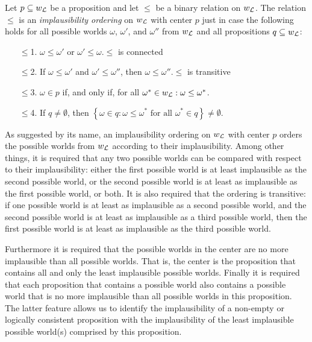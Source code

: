 Let $p\subseteq w_{\cal L}$ be a proposition and let $\leq$ be a binary relation on $w_{\cal L}$. The relation $\leq$ is an \emph{implausibility ordering} on $w_{\cal L}$ with center $p$ just in case the following holds for all possible worlds $\omega$, $\omega'$, and $\omega''$ from $w_{\cal L}$ and all propositions $q\subseteq w_{\cal L}$:
\begin{enumerate}
\item[$\leq$1.] $\omega\leq\omega'$ or $\omega'\leq\omega$.\hfill $\leq$ is connected
\item[$\leq$2.] If $\omega\leq\omega'$ and $\omega'\leq\omega''$, then $\omega\leq\omega''$.\hfill $\leq$ is transitive
\item[$\leq$3.] $\omega\in p$ if, and only if, for all $\omega^*\in w_{\cal L}:\omega\leq\omega^*$.
\item[$\leq$4.] If $q\neq\emptyset$, then $\left\{\omega\in q:\omega\leq\omega^*\mbox{ for all }\omega^*\in q\right\}\neq\emptyset$.
\end{enumerate}
As suggested by its name, an implausibility ordering on $w_{\cal L}$ with center $p$ orders the possible worlds from $w_{\cal L}$ according to their implausibility. Among other things, it is required that any two possible worlds can be compared with respect to their implausibility: either the first possible world is at least implausible as the second possible world, or the second possible world is at least as implausible as the first possible world, or both. It is also required that the ordering is transitive: if one possible world is at least as implausible as a second possible world, and the second possible world is at least as implausible as a third possible world, then the first possible world is at least as implausible as the third possible world.

Furthermore it is required that the possible worlds in the center are no more implausible than all possible worlds. That is, the center is the proposition that contains all and only the least implausible possible worlds. Finally it is required that each proposition that contains a possible world also contains a possible world that is no more implausible than all possible worlds in this proposition. The latter feature allows us to identify the implausibility of a non-empty or logically consistent proposition with the implausibility of the least implausible possible world(s) comprised by this proposition.

